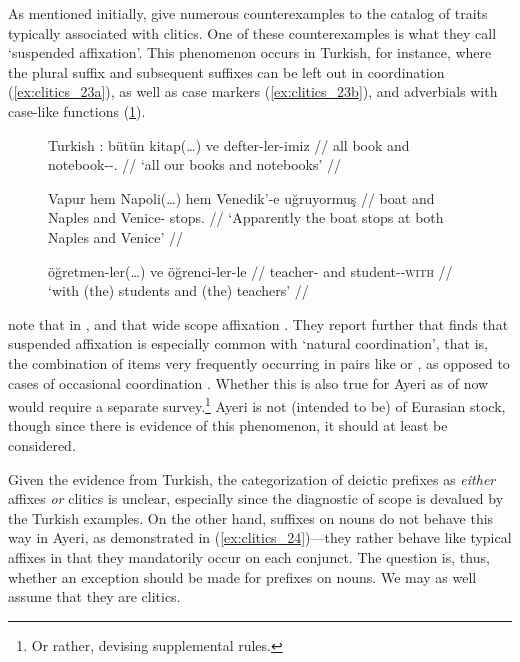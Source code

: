 As mentioned initially, \citet{spencerluis2012} give numerous counterexamples
to the catalog of traits typically associated with clitics. One of these
counterexamples is what they call `suspended affixation'. This phenomenon
occurs in Turkish, for instance, where the plural suffix 
 and subsequent suffixes can be left out in coordination
(\ref{ex:clitics_23a}), as well as case markers (\ref{ex:clitics_23b}), and
adverbials with case-like functions (\ref{ex:clitics_23c}).

\begin{figure}
\pex\label{ex:clitics_23}
Turkish \citep[199]{spencerluis2012}:
\a\label{ex:clitics_23a}\begingl
	\gla bütün kitap\textup{(}\dots\textup{)} ve defter-ler-imiz //
	\glb all book and notebook-\Pl{}-\Fpl{}.\Poss{} //
	\glft `all our books and notebooks' //
\endgl

\a\label{ex:clitics_23b}\begingl
	\gla Vapur hem Napoli\textup{(}\dots\textup{)} hem Venedik'-e uğruyormuş //
	\glb boat and Naples and Venice-\Loc{} stops.\Evid{} //
	\glft `Apparently the boat stops at both Naples and Venice' //
\endgl

\a\label{ex:clitics_23c}\begingl
	\gla öğretmen-ler\textup{(}\dots\textup{)} ve öğrenci-ler-le //
	\glb teacher-\Pl{} and student-\Pl{}-\textsc{with} //
	\glft `with (the) students and (the) teachers' //
\endgl
\xe
\end{figure}

\citet{spencerluis2012} note that in , and that wide scope affixation . They report further that \citet{wälchli2005} finds
that suspended affixation is especially common with `natural coordination',
that is, the combination of items very frequently occurring in pairs like
 or , as opposed to cases of
occasional coordination \citep[200]{spencerluis2012}. Whether this is also true
for Ayeri as of now would require a separate survey.\footnote{Or rather,
devising supplemental rules.} Ayeri is not (intended to be) of Eurasian stock,
though since there is evidence of this phenomenon, it should at least be
considered.

Given the evidence from Turkish, the categorization of deictic prefixes as
\emph{either} affixes \emph{or} clitics is unclear, especially since the
diagnostic of scope is devalued by the Turkish examples. On the other hand,
suffixes on nouns do not behave this way in Ayeri, as demonstrated in
(\ref{ex:clitics_24})---they rather behave like typical affixes in that they
mandatorily occur on each conjunct. The question is, thus, whether an exception
should be made for prefixes on nouns. We may as well assume that they are
clitics.

